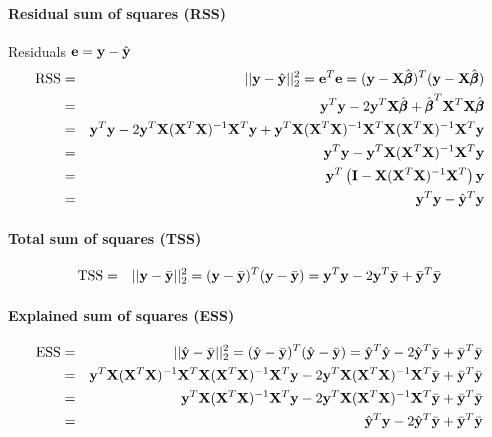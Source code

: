 \paragraph{Residual sum of squares (RSS)}
Residuals $\be = \by - \hat{\by}$
\begin{eqnarray*}
\text{RSS} & = & ||\by - \hat{\by}||_2^2 = \be^T \be = (\by - \bX \hat{\pb})^T (\by - \bX \hat{\pb}) \\
& = & \by^T \by - 2 \by^T \bX \hat{\pb}  + \hat{\pb}^T \bX^T \bX \hat{\pb} \\
& = & \by^T \by - 2 \by^T \bX  (\bX^T \bX)^{-1} \bX^T \by + 
\by^T \bX  (\bX^T \bX)^{-1} \bX^T \bX  (\bX^T \bX)^{-1} \bX^T \by \\
& = & \by^T \by - \by^T \bX  (\bX^T \bX)^{-1} \bX^T \by \\
& = & \by^T \left( \bI - \bX  (\bX^T \bX)^{-1} \bX^T \right) \by \\
& = & \by^T \by - \hat{\by}^T \by
\end{eqnarray*}


\paragraph{Total sum of squares (TSS)}
\begin{eqnarray*}
\text{TSS} & = & ||\by - \bar{\by}||_2^2 = (\by - \bar{\by})^T (\by - \bar{\by}) 
= \by^T \by - 2 \by^T \bar{\by} + \bar{\by}^T \bar{\by}
\end{eqnarray*}

\paragraph{Explained sum of squares (ESS)}
\begin{eqnarray*}
\text{ESS} & = & ||\hat{\by} - \bar{\by}||_2^2 = (\hat{\by} - \bar{\by})^T (\hat{\by} - \bar{\by}) 
= \hat{\by}^T \hat{\by} - 2 \hat{\by}^T \bar{\by} + \bar{\by}^T \bar{\by} \\
& = & 
\by^T \bX  (\bX^T \bX)^{-1} \bX^T \bX  (\bX^T \bX)^{-1} \bX^T \by
- 2 \by^T \bX  (\bX^T \bX)^{-1} \bX^T \bar{\by} + \bar{\by}^T \bar{\by} \\
& = &  \by^T \bX  (\bX^T \bX)^{-1} \bX^T \by
- 2 \by^T \bX  (\bX^T \bX)^{-1} \bX^T \bar{\by} + \bar{\by}^T \bar{\by} \\
& = &  \hat{\by}^T \by
- 2 \hat{\by}^T \bar{\by} + \bar{\by}^T \bar{\by} 
\end{eqnarray*}

